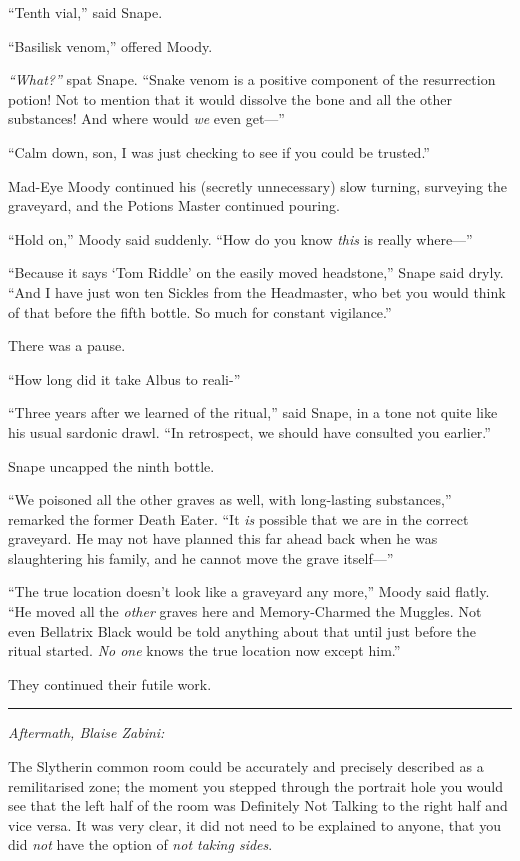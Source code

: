 ``Tenth vial,'' said Snape.

``Basilisk venom,'' offered Moody.

\emph{``What?''} spat Snape. ``Snake venom is a positive component of
the resurrection potion! Not to mention that it would dissolve the bone
and all the other substances! And where would \emph{we} even get---''

``Calm down, son, I was just checking to see if you could be trusted.''

Mad-Eye Moody continued his (secretly unnecessary) slow turning,
surveying the graveyard, and the Potions Master continued pouring.

``Hold on,'' Moody said suddenly. ``How do you know \emph{this} is
really where---''

``Because it says `Tom Riddle' on the easily moved headstone,'' Snape
said dryly. ``And I have just won ten Sickles from the Headmaster, who
bet you would think of that before the fifth bottle. So much for
constant vigilance.''

There was a pause.

``How long did it take Albus to reali-''

``Three years after we learned of the ritual,'' said Snape, in a tone
not quite like his usual sardonic drawl. ``In retrospect, we should have
consulted you earlier.''

Snape uncapped the ninth bottle.

``We poisoned all the other graves as well, with long-lasting
substances,'' remarked the former Death Eater. ``It \emph{is} possible
that we are in the correct graveyard. He may not have planned this far
ahead back when he was slaughtering his family, and he cannot move the
grave itself---''

``The true location doesn't look like a graveyard any more,'' Moody said
flatly. ``He moved all the \emph{other} graves here and Memory-Charmed
the Muggles. Not even Bellatrix Black would be told anything about that
until just before the ritual started. \emph{No one} knows the true
location now except him.''

They continued their futile work.

\begin{center}\rule{3in}{0.4pt}\end{center}

\emph{Aftermath, Blaise Zabini:}

The Slytherin common room could be accurately and precisely described as
a remilitarised zone; the moment you stepped through the portrait hole
you would see that the left half of the room was Definitely Not Talking
to the right half and vice versa. It was very clear, it did not need to
be explained to anyone, that you did \emph{not} have the option of
\emph{not taking sides}.

